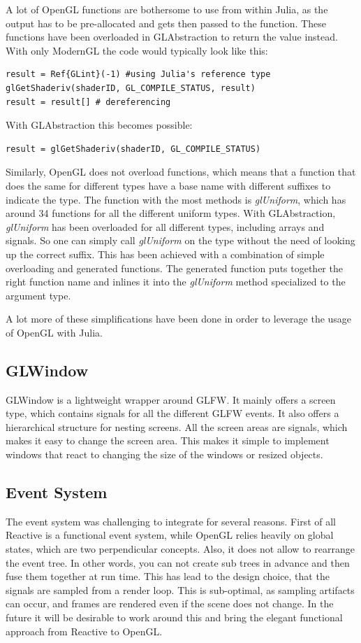 A lot of OpenGL functions are bothersome to use from within Julia, as the output has to be pre-allocated and gets then passed to the function.
These functions have been overloaded in GLAbstraction to return the value instead.
With only ModernGL the code would typically look like this:
\begin{lstlisting}
result = Ref{GLint}(-1) #using Julia's reference type
glGetShaderiv(shaderID, GL_COMPILE_STATUS, result)
result = result[] # dereferencing
\end{lstlisting}
With GLAbstraction this becomes possible:
\begin{lstlisting}
result = glGetShaderiv(shaderID, GL_COMPILE_STATUS)
\end{lstlisting}

Similarly, OpenGL does not overload functions, which means that a function that does the same for different types have a base name with different suffixes to indicate the type.
The function with the most methods is \textit{glUniform}, which has around 34 functions for all the different uniform types. With GLAbstraction, \textit{glUniform} has been overloaded for all different types, including arrays and signals. So one can simply call \textit{glUniform} on the type without the need of looking up the correct suffix.
This has been achieved with a combination of simple overloading and generated functions. The generated function puts together the right function name and inlines it into the \textit{glUniform} method specialized to the argument type.

A lot more of these simplifications have been done in order to leverage the usage of OpenGL with Julia.

\subsection{GLWindow}
GLWindow is a lightweight wrapper around GLFW.
It mainly offers a screen type, which contains signals for all the different GLFW events. 
It also offers a hierarchical structure for nesting screens.
All the screen areas are signals, which makes it easy to change the screen area. 
This makes it simple to implement windows that react to changing the size of the windows or resized objects.

\subsection{Event System}

The event system was challenging to integrate for several reasons.
First of all Reactive is a functional event system, while \ac{OpenGL} relies heavily on global states, which are two perpendicular concepts.
Also, it does not allow to rearrange the event tree. 
In other words, you can not create sub trees in advance and then fuse them together at run time.
This has lead to the design choice, that the signals are sampled from a render loop.
This is sub-optimal, as sampling artifacts can occur, and frames are rendered even if the scene does not change.
In the future it will be desirable to work around this and bring the elegant functional approach from Reactive to OpenGL.


